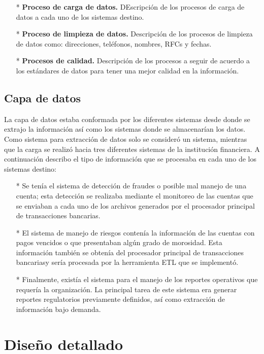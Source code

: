 \documentclass[a4paper,openright,12pt]{book}
\begin{document}
\begin{itemize}
\begin{itemize}
\item[*] \textbf{Proceso de carga de datos.} DEscripci\'on de los procesos de carga de datos a cada uno de los sistemas destino.
\item[*] \textbf{Proceso de limpieza de datos.} Descripci\'on de los procesos de limpieza de datos como: direcciones, tel\'efonos, nombres, RFCs y fechas.
\item[*] \textbf{Procesos de calidad.} Descripci\'on de los procesos a seguir de acuerdo a los est\'andares de datos para tener una mejor calidad en la informaci\'on. 
\end{itemize}
\end{itemize}

\section{Capa de datos}
La capa de datos estaba conformada por los diferentes sistemas desde donde se extrajo la informaci\'on as\'i como los sistemas donde se almacenar\'ian los datos. Como sistema para extracci\'on de datos solo se consider\'o un sistema, mientras que la carga se realiz\'o hacia tres diferentes sistemas de la instituci\'on financiera. A continuaci\'on describo el tipo de informaci\'on que se procesaba en cada uno de los sistemas destino:
\begin{itemize}
\item[*] Se ten\'ia el sistema de detecci\'on de fraudes o posible mal manejo de una cuenta; esta detecci\'on se realizaba mediante el monitoreo de las cuentas que se enviaban a cada uno de los archivos generados por el procesador principal de transacciones bancarias.
\item[*] El sistema de manejo de riesgos conten\'ia la informaci\'on de las cuentas con pagos vencidos o que presentaban alg\'un grado de morosidad. Esta informaci\'on tambi\'en se obten\'ia del procesador principal de transacciones bancariasy ser\'ia procesada por la herramienta ETL que se implement\'o.
\item[*]Finalmente, exist\'ia el sistema para el manejo de los reportes operativos que requer\'ia la organizaci\'on. La principal tarea de este sistema era generar reportes regulatorios previamente definidos, as\'i como extracci\'on de informaci\'on bajo demanda.
\end{itemize}

\chapter{Dise\~no detallado}
\end{document}
